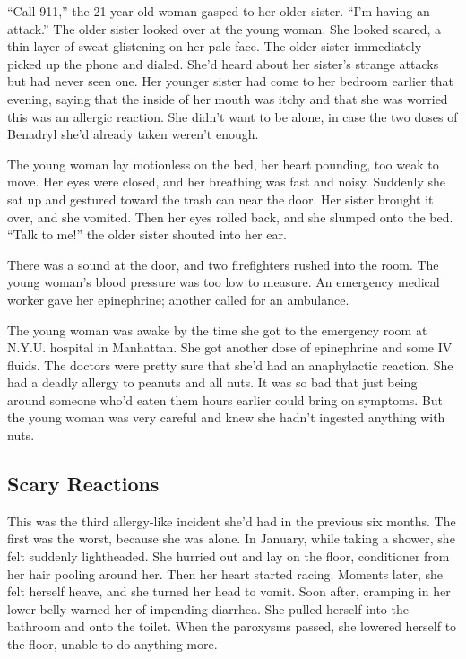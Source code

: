 ``Call 911,'' the 21-year-old woman gasped to her older sister. ``I'm
having an attack.'' The older sister looked over at the young woman. She
looked scared, a thin layer of sweat glistening on her pale face. The
older sister immediately picked up the phone and dialed. She'd heard
about her sister's strange attacks but had never seen one. Her younger
sister had come to her bedroom earlier that evening, saying that the
inside of her mouth was itchy and that she was worried this was an
allergic reaction. She didn't want to be alone, in case the two doses of
Benadryl she'd already taken weren't enough.

The young woman lay motionless on the bed, her heart pounding, too weak
to move. Her eyes were closed, and her breathing was fast and noisy.
Suddenly she sat up and gestured toward the trash can near the door. Her
sister brought it over, and she vomited. Then her eyes rolled back, and
she slumped onto the bed. ``Talk to me!'' the older sister shouted into
her ear.

There was a sound at the door, and two firefighters rushed into the
room. The young woman's blood pressure was too low to measure. An
emergency medical worker gave her epinephrine; another called for an
ambulance.

The young woman was awake by the time she got to the emergency room at
N.Y.U. hospital in Manhattan. She got another dose of epinephrine and
some IV fluids. The doctors were pretty sure that she'd had an
anaphylactic reaction. She had a deadly allergy to peanuts and all nuts.
It was so bad that just being around someone who'd eaten them hours
earlier could bring on symptoms. But the young woman was very careful
and knew she hadn't ingested anything with nuts.

\hypertarget{scary-reactions}{%
\subsection{\texorpdfstring{\textbf{Scary
Reactions}}{Scary Reactions}}\label{scary-reactions}}

This was the third allergy-like incident she'd had in the previous six
months. The first was the worst, because she was alone. In January,
while taking a shower, she felt suddenly lightheaded. She hurried out
and lay on the floor, conditioner from her hair pooling around her. Then
her heart started racing. Moments later, she felt herself heave, and she
turned her head to vomit. Soon after, cramping in her lower belly warned
her of impending diarrhea. She pulled herself into the bathroom and onto
the toilet. When the paroxysms passed, she lowered herself to the floor,
unable to do anything more.

